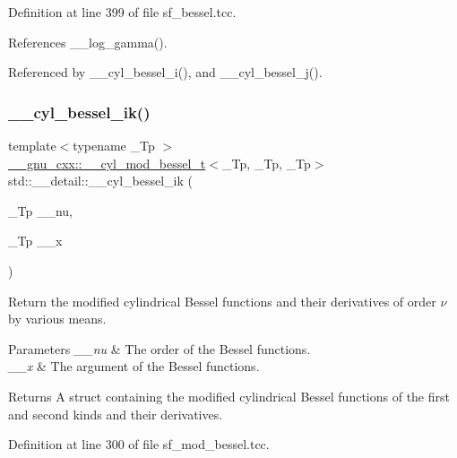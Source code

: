 Definition at line 399 of file sf\+\_\+bessel.\+tcc.



References \+\_\+\+\_\+log\+\_\+gamma().



Referenced by \+\_\+\+\_\+cyl\+\_\+bessel\+\_\+i(), and \+\_\+\+\_\+cyl\+\_\+bessel\+\_\+j().

\mbox{\label{namespacestd_1_1____detail_a9ada6640e605fc21b12191e651e39de1}} 
\subsubsection{\texorpdfstring{\+\_\+\+\_\+cyl\+\_\+bessel\+\_\+ik()}{\_\_cyl\_bessel\_ik()}}
{\footnotesize\ttfamily template$<$typename \+\_\+\+Tp $>$ \\
\hyperlink{struct____gnu__cxx_1_1____cyl__mod__bessel__t}{\+\_\+\+\_\+gnu\+\_\+cxx\+::\+\_\+\+\_\+cyl\+\_\+mod\+\_\+bessel\+\_\+t}$<$\+\_\+\+Tp, \+\_\+\+Tp, \+\_\+\+Tp$>$ std\+::\+\_\+\+\_\+detail\+::\+\_\+\+\_\+cyl\+\_\+bessel\+\_\+ik (\begin{DoxyParamCaption}\item[{\+\_\+\+Tp}]{\+\_\+\+\_\+nu,  }\item[{\+\_\+\+Tp}]{\+\_\+\+\_\+x }\end{DoxyParamCaption})}



Return the modified cylindrical Bessel functions and their derivatives of order $ \nu $ by various means. 


\begin{DoxyParams}{Parameters}
{\em \+\_\+\+\_\+nu} & The order of the Bessel functions. \\
\hline
{\em \+\_\+\+\_\+x} & The argument of the Bessel functions. \\
\hline
\end{DoxyParams}
\begin{DoxyReturn}{Returns}
A struct containing the modified cylindrical Bessel functions of the first and second kinds and their derivatives. 
\end{DoxyReturn}


Definition at line 300 of file sf\+\_\+mod\+\_\+bessel.\+tcc.



